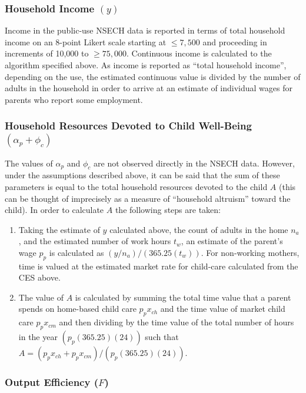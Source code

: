 \documentclass[]{elsarticle}
\begin{document}
\subsubsection{Household Income $(y)$}\label{household-income-y}

Income in the public-use NSECH data is reported in terms of total
household income on an 8-point Likert scale starting at $\le 7,500$ and
proceeding in increments of 10,000 to $\ge 75,000$. Continuous income is
calculated to the algorithm specified above. As income is reported as
``total household income'', depending on the use, the estimated
continuous value is divided by the number of adults in the household in
order to arrive at an estimate of individual wages for parents who
report some employment.

\subsubsection{Household Resources Devoted to Child Well-Being
$(\alpha_p + \phi_c)$}\label{household-resources-devoted-to-child-well-being-alphaux5fp-phiux5fc}

The values of $\alpha_p$ and $\phi_c$ are not observed directly in the
NSECH data. However, under the assumptions described above, it can be
said that the sum of these parameters is equal to the total household
resources devoted to the child $A$ (this can be thought of imprecisely
as a measure of ``household altruism'' toward the child). In order to
calculate $A$ the following steps are taken:

\begin{enumerate}
\def\labelenumi{\arabic{enumi}.}
\item
  Taking the estimate of $y$ calculated above, the count of adults in
  the home $n_a$, and the estimated number of work hours $t_w$, an
  estimate of the parent's wage $p_p$ is calculated as
  $(y/n_a)/(365.25(t_w))$. For non-working mothers, time is valued at
  the estimated market rate for child-care calculated from the CES
  above.
\item
  The value of $A$ is calculated by summing the total time value that a
  parent spends on home-based child care $p_px_{ch}$ and the time value
  of market child care $p_px_{cm}$ and then dividing by the time value
  of the total number of hours in the year $(p_p(365.25)(24))$ such that
  $A=(p_px_{ch}+p_px_{cm})/(p_p(365.25)(24))$.
\end{enumerate}

\subsubsection{Output Efficiency ($F$)}\label{output-efficiency-f}
\end{document}
